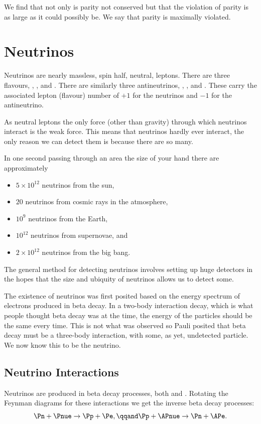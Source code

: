 \documentclass[fleqn]{NotesClass}
\begin{document}
    We find that not only is parity not conserved but that the violation of parity is as large as it could possibly be.
    We say that parity is maximally violated.
    
    \chapter{Neutrinos}
    Neutrinos are nearly massless, spin half, neutral, leptons.
    There are three flavours, \Pnue, \Pnumu, and \Pnutau.
    There are similarly three antineutrinos, \APnue, \APnumu, and \APnutau.
    These carry the associated lepton (flavour) number of \(+1\) for the neutrinos and \(-1\) for the antineutrino.
    
    As neutral leptons the only force (other than gravity) through which neutrinos interact is the weak force.
    This means that neutrinos hardly ever interact, the only reason we can detect them is because there are so many.
    
    In one second passing through an area the size of your hand there are approximately
    \begin{itemize}
        \item \(5\times 10^{12}\) neutrinos from the sun,
        \item \(20\) neutrinos from cosmic rays in the atmosphere,
        \item \(10^{9}\) neutrinos from the Earth,
        \item \(10^{12}\) neutrinos from supernovae, and
        \item \(2\times 10^{12}\) neutrinos from the big bang.
    \end{itemize}
    The general method for detecting neutrinos involves setting up huge detectors in the hopes that the size and ubiquity of neutrinos allows us to detect some.
    
    The existence of neutrinos was first posited based on the energy spectrum of electrons produced in beta decay.
    In a two-body interaction decay, which is what people thought beta decay was at the time, the energy of the particles should be the same every time.
    This is not what was observed so Pauli posited that beta decay must be a three-body interaction, with some, as yet, undetected particle.
    We now know this to be the neutrino.
    
    \section{Neutrino Interactions}
    Neutrinos are produced in beta decay processes, both \Pbetaminus{} and \APbeta.
    Rotating the Feynman diagrams for these interactions we get the inverse beta decay processes:
    \begin{equation}
        \Pn + \Pnue \to \Pp + \Pe, \qqand \Pp + \APnue \to \Pn + \APe.
    \end{equation}
    
\end{document}
